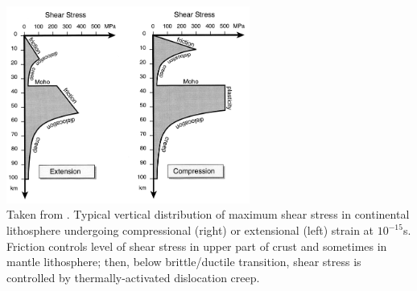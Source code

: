 \begin{center}
\includegraphics[width=8cm]{images/rheology/bird99}\\
{\captionfont Taken from \cite{bird99}.
Typical vertical distribution of maximum shear stress in continental lithosphere 
undergoing compressional (right) or extensional (left) strain at $10^{-15}$s. 
Friction controls level of shear stress in upper part of crust and sometimes in mantle lithosphere;
then, below brittle/ductile transition, shear stress is controlled by thermally-activated dislocation creep.}
\end{center}

\Literature \cite{buwa06,budr08,rana97a,rana97b}





